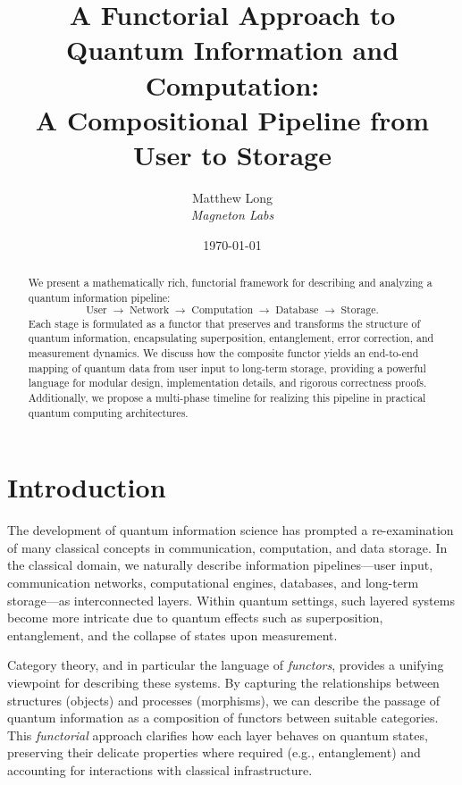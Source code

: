 \documentclass[12pt]{article}
\title{\textbf{A Functorial Approach to Quantum Information and Computation:\\
A Compositional Pipeline from User to Storage}}
\author{
  Matthew Long \\
  \textit{Magneton Labs}
}
\date{\today}
\begin{document}
\maketitle

\begin{abstract}
We present a mathematically rich, functorial framework for describing and analyzing a quantum information pipeline:
\[
\text{User} \;\longrightarrow\; \text{Network} \;\longrightarrow\; \text{Computation} \;\longrightarrow\; \text{Database} \;\longrightarrow\; \text{Storage}.
\]
Each stage is formulated as a functor that preserves and transforms the structure of quantum information, encapsulating superposition, entanglement, error correction, and measurement dynamics. We discuss how the composite functor yields an end-to-end mapping of quantum data from user input to long-term storage, providing a powerful language for modular design, implementation details, and rigorous correctness proofs. Additionally, we propose a multi-phase timeline for realizing this pipeline in practical quantum computing architectures. 
\end{abstract}

\tableofcontents

\section{Introduction}

The development of quantum information science has prompted a re-examination of many classical concepts in communication, computation, and data storage. In the classical domain, we naturally describe information pipelines---user input, communication networks, computational engines, databases, and long-term storage---as interconnected layers. Within quantum settings, such layered systems become more intricate due to quantum effects such as superposition, entanglement, and the collapse of states upon measurement.

Category theory, and in particular the language of \textit{functors}, provides a unifying viewpoint for describing these systems. By capturing the relationships between structures (objects) and processes (morphisms), we can describe the passage of quantum information as a composition of functors between suitable categories. This \textit{functorial} approach clarifies how each layer behaves on quantum states, preserving their delicate properties where required (e.g., entanglement) and accounting for interactions with classical infrastructure.
\end{document}
